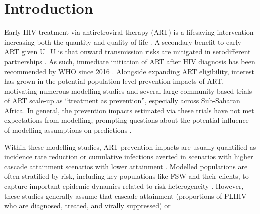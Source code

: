 \section{Introduction}\label{art.intro}
Early HIV treatment via antiretroviral therapy (ART)
is a lifesaving intervention increasing both the quantity and quality of life
\cite{Gabillard2013,Maartens2014,Danel2015,Lundgren2015init}.
A secondary benefit to early ART given U=U is that
onward transmission risks are mitigated in serodifferent partnerships
\cite{Anglemyer2013,Cohen2016,Rodger2019}.
As such, immediate initiation of ART after HIV diagnosis
has been recommended by WHO since 2016 \cite{WHO2016art}.
Alongside expanding ART eligibility,
interest has grown in the potential population-level prevention impacts of ART, motivating
numerous modelling studies \cite{Granich2009,Eaton2012,Eaton2014art,Knight2022sr} and
several large community-based trials \cite{Makhema2019,Havlir2019,Hayes2019,Iwuji2018}
of ART scale-up as ``treatment as prevention'', especially across Sub-Saharan Africa.
In general, the prevention impacts estimated via these trials
have not met expectations from modelling, prompting questions about
the potential influence of modelling assumptions on predictions \cite{Baral2019}.
\par
Within these modelling studies, ART prevention impacts are usually quantified as
incidence rate reduction or cumulative infections averted
in scenarios with higher cascade attainment \vs scenarios with lower attainment \cite{Knight2022sr}.
Modelled populations are often stratified by risk,
including key populations like FSW and their clients,
to capture important epidemic dynamics related to risk heterogeneity
\cite{Stigum1994,Garnett1996,Watts2010}.
However, these studies generally assume that cascade
attainment (\ie proportions of PLHIV who are diagnosed, treated, and virally suppressed) or
